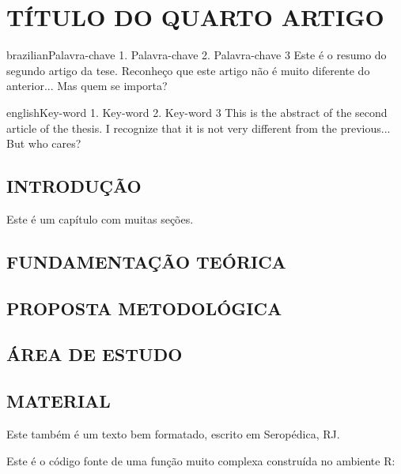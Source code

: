 \artigotrue
\chapter{TÍTULO DO QUARTO ARTIGO}
\label{chap:chapter04}

\begin{chapterabstract}{brazilian}{Palavra-chave 1. Palavra-chave 2. Palavra-chave 3}
Este é o resumo do segundo artigo da tese. Reconheço que este artigo não é muito
diferente do anterior... Mas quem se importa?
\end{chapterabstract}

\begin{chapterabstract}{english}{Key-word 1. Key-word 2. Key-word 3}
This is the abstract of the second article of the thesis. I recognize that it is
not very different from the previous... But who cares?
\end{chapterabstract}

\formatchapter

\section{INTRODUÇÃO}

Este é um capítulo com muitas seções.

\section{FUNDAMENTAÇÃO TEÓRICA}

\blindtext[1]

\section{PROPOSTA METODOLÓGICA}

\blindtext[1]

\section{ÁREA DE ESTUDO}

\section{MATERIAL}

Este também é um texto bem formatado, escrito em Seropédica, RJ. \blindtext[1]

Este é o código fonte de uma função muito complexa construída no ambiente R:

